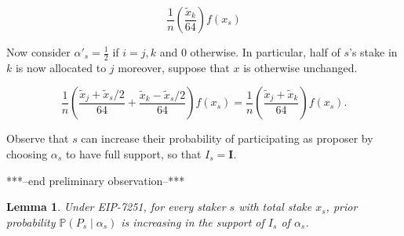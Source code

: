 \documentclass{article}
\newcommand{\eb}{x}
\newcommand{\prob}{\mathbb P}
\newcommand{\teb}{\tilde{\eb}}
\newtheorem{lemma}{Lemma}
\begin{document}
  \[ \frac{1}{n} \left(\frac{\teb_k}{64}\right) f(\eb_s) \]
  
  Now consider $\alpha'_s = \frac{1}{2}$ if $i = j, k$ and $0$ otherwise. In
  particular, half of $s$'s stake in $k$ is now allocated to $j$ moreover, 
  suppose that $\eb$ is otherwise unchanged. 

  \[ \frac{1}{n} \left(
      \frac{\teb_j + \teb_s/2}{64}
      +\frac{\teb_k - \teb_s/2}{64}\right) f(\eb_s) 
     = \frac{1}{n} \left(\frac{\teb_j + \teb_k}{64}\right) f(\eb_s).
  \]

  Observe that $s$ can increase their probability of participating as proposer
  by choosing $\alpha_s$ to have full support, so that $I_s = \mathbf I$.

***--end preliminary observation--***
\begin{lemma}
  Under EIP-7251, for every staker $s$ with total stake $\eb_s$,  prior
  probability  $\prob(P_s \mid \alpha_s)$ is increasing in the support of $I_s$
  of $\alpha_s$.
\end{lemma}
\end{document}

